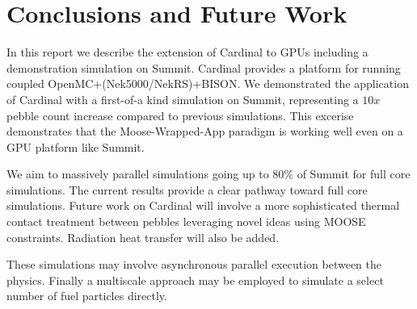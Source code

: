 
\section{Conclusions and Future Work}
\label{s:sum}

In this report we describe the extension of Cardinal to GPUs including a demonstration simulation on Summit. Cardinal provides a platform for running coupled OpenMC+(Nek5000/NekRS)+BISON. We demonstrated the application of Cardinal with a first-of-a kind simulation on Summit, representing a $10x$ pebble count increase compared to previous simulations. This excerise demonstrates that the Moose-Wrapped-App paradigm is working well even on a GPU platform like Summit.

We aim to massively parallel simulations going up to 80\% of Summit for full core simulations. The current results provide a clear pathway toward full core simulations. Future work on Cardinal will involve a more sophisticated thermal contact treatment between pebbles leveraging novel ideas using MOOSE constraints. Radiation heat transfer will also be added.

These simulations may involve asynchronous parallel execution between the
physics. Finally a multiscale approach may be employed to simulate a select number of fuel particles directly.
